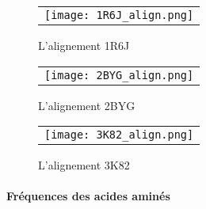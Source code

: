     \clearpage

   \begin{figure}[t]
     \centering
     \begin{tabular}{c}
       \texttt{[image: 1R6J\_align.png]} \\
     \end{tabular}
     \caption{L'alignement 1R6J }
\label{graph:convEref}
   \end{figure}

    \clearpage

   \begin{figure}[t]
     \centering
     \begin{tabular}{c}
       \texttt{[image: 2BYG\_align.png]} \\
     \end{tabular}
     \caption{L'alignement 2BYG }
\label{graph:convEref}
   \end{figure}

    \clearpage

   \begin{figure}[t]
     \centering
     \begin{tabular}{c}
       \texttt{[image: 3K82\_align.png]} \\
     \end{tabular}
     \caption{L'alignement 3K82 }
\label{graph:convEref}
   \end{figure}

    \clearpage




\paragraph{Fréquences des acides aminés}


